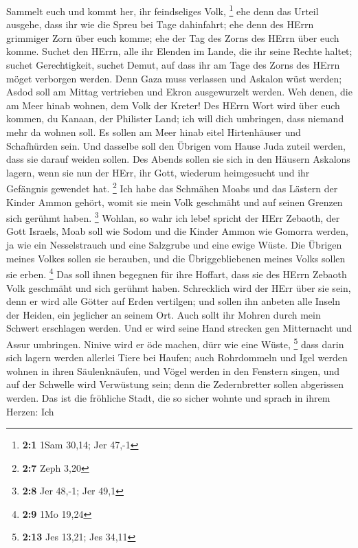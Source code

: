  Sammelt euch und kommt her, ihr feindseliges Volk,
\footnote{\textbf{2:1} 1Sam 30,14; Jer 47,-1}  ehe denn das
Urteil ausgehe, dass ihr wie die Spreu bei Tage dahinfahrt; ehe denn des
HErrn grimmiger Zorn über euch komme; ehe der Tag des Zorns des HErrn
über euch komme.  Suchet den HErrn, alle ihr Elenden im
Lande, die ihr seine Rechte haltet; suchet Gerechtigkeit, suchet Demut,
auf dass ihr am Tage des Zorns des HErrn möget verborgen werden.
 Denn Gaza muss verlassen und Askalon wüst werden; Asdod
soll am Mittag vertrieben und Ekron ausgewurzelt werden. 
Weh denen, die am Meer hinab wohnen, dem Volk der Kreter! Des HErrn Wort
wird über euch kommen, du Kanaan, der Philister Land; ich will dich
umbringen, dass niemand mehr da wohnen soll.  Es sollen am
Meer hinab eitel Hirtenhäuser und Schafhürden sein.  Und
dasselbe soll den Übrigen vom Hause Juda zuteil werden, dass sie darauf
weiden sollen. Des Abends sollen sie sich in den Häusern Askalons
lagern, wenn sie nun der HErr, ihr Gott, wiederum heimgesucht und ihr
Gefängnis gewendet hat. \footnote{\textbf{2:7} Zeph 3,20} 
Ich habe das Schmähen Moabs und das Lästern der Kinder Ammon gehört,
womit sie mein Volk geschmäht und auf seinen Grenzen sich gerühmt haben.
\footnote{\textbf{2:8} Jer 48,-1; Jer 49,1}  Wohlan, so wahr
ich lebe! spricht der HErr Zebaoth, der Gott Israels, Moab soll wie
Sodom und die Kinder Ammon wie Gomorra werden, ja wie ein Nesselstrauch
und eine Salzgrube und eine ewige Wüste. Die Übrigen meines Volkes
sollen sie berauben, und die Übriggebliebenen meines Volks sollen sie
erben. \footnote{\textbf{2:9} 1Mo 19,24}  Das soll ihnen
begegnen für ihre Hoffart, dass sie des HErrn Zebaoth Volk geschmäht und
sich gerühmt haben.  Schrecklich wird der HErr über sie
sein, denn er wird alle Götter auf Erden vertilgen; und sollen ihn
anbeten alle Inseln der Heiden, ein jeglicher an seinem Ort.
 Auch sollt ihr Mohren durch mein Schwert erschlagen
werden.  Und er wird seine Hand strecken gen Mitternacht
und Assur umbringen. Ninive wird er öde machen, dürr wie eine Wüste,
\footnote{\textbf{2:13} Jes 13,21; Jes 34,11}  dass darin
sich lagern werden allerlei Tiere bei Haufen; auch Rohrdommeln und Igel
werden wohnen in ihren Säulenknäufen, und Vögel werden in den Fenstern
singen, und auf der Schwelle wird Verwüstung sein; denn die
Zedernbretter sollen abgerissen werden.  Das ist die
fröhliche Stadt, die so sicher wohnte und sprach in ihrem Herzen: Ich

